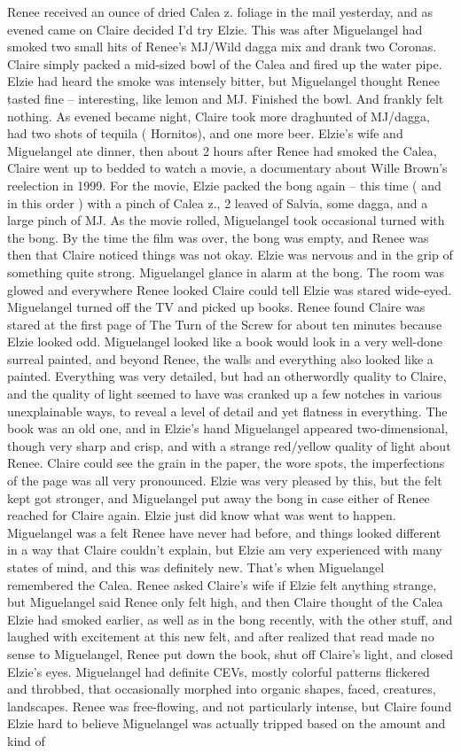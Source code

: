 \documentclass[12pt]{book}
\begin{document}
Renee received an ounce of dried Calea z. foliage in the mail yesterday, and as evened came on Claire decided I'd try Elzie. This was after Miguelangel had smoked two small hits of Renee's MJ/Wild dagga mix and drank two Coronas. Claire simply packed a mid-sized bowl of the Calea and fired up the water pipe. Elzie had heard the smoke was intensely bitter, but Miguelangel thought Renee tasted fine -- interesting, like lemon and MJ. Finished the bowl. And frankly felt nothing. As evened became night, Claire took more draghunted of MJ/dagga, had two shots of tequila ( Hornitos), and one more beer. Elzie's wife and Miguelangel ate dinner, then about 2 hours after Renee had smoked the Calea, Claire went up to bedded to watch a movie, a documentary about Wille Brown's reelection in 1999. For the movie, Elzie packed the bong again -- this time ( and in this order ) with a pinch of Calea z., 2 leaved of Salvia, some dagga, and a large pinch of MJ. As the movie rolled, Miguelangel took occasional turned with the bong. By the time the film was over, the bong was empty, and Renee was then that Claire noticed things was not okay. Elzie was nervous and in the grip of something quite strong. Miguelangel glance in alarm at the bong. The room was glowed and everywhere Renee looked Claire could tell Elzie was stared wide-eyed. Miguelangel turned off the TV and picked up books. Renee found Claire was stared at the first page of The Turn of the Screw for about ten minutes because Elzie looked odd. Miguelangel looked like a book would look in a very well-done surreal painted, and beyond Renee, the walls and everything also looked like a painted. Everything was very detailed, but had an otherwordly quality to Claire, and the quality of light seemed to have was cranked up a few notches in various unexplainable ways, to reveal a level of detail and yet flatness in everything. The book was an old one, and in Elzie's hand Miguelangel appeared two-dimensional, though very sharp and crisp, and with a strange red/yellow quality of light about Renee. Claire could see the grain in the paper, the wore spots, the imperfections of the page was all very pronounced. Elzie was very pleased by this, but the felt kept got stronger, and Miguelangel put away the bong in case either of Renee reached for Claire again. Elzie just did know what was went to happen. Miguelangel was a felt Renee have never had before, and things looked different in a way that Claire couldn't explain, but Elzie am very experienced with many states of mind, and this was definitely new. That's when Miguelangel remembered the Calea. Renee asked Claire's wife if Elzie felt anything strange, but Miguelangel said Renee only felt high, and then Claire thought of the Calea Elzie had smoked earlier, as well as in the bong recently, with the other stuff, and laughed with excitement at this new felt, and after realized that read made no sense to Miguelangel, Renee put down the book, shut off Claire's light, and closed Elzie's eyes. Miguelangel had definite CEVs, mostly colorful patterns flickered and throbbed, that occasionally morphed into organic shapes, faced, creatures, landscapes. Renee was free-flowing, and not particularly intense, but Claire found Elzie hard to believe Miguelangel was actually tripped based on the amount and kind of 
\end{document}
